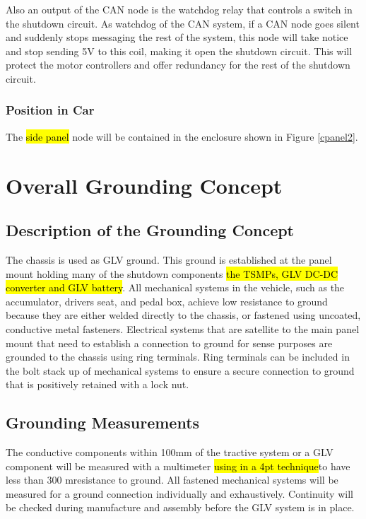\documentclass{article}
\DeclareRobustCommand{\hlr}[1]{{\sethlcolor{red}\hl{#1}}}
\begin{document}
            Also an output of the CAN node is the watchdog relay that controls a switch in the shutdown circuit. As watchdog of the CAN system, if a CAN node goes silent and suddenly stops messaging the rest of the system, this node will take notice and stop sending 5V to this coil, making it open the shutdown circuit. This will protect the motor controllers and offer redundancy for the rest of the shutdown circuit.

        \subsubsection{Position in Car}

            The \hlr{side panel} node will be contained in the enclosure shown in Figure \ref{cpanel2}.

\newpage

\section{Overall Grounding Concept}

    \subsection{Description of the Grounding Concept}


        The chassis is used as GLV ground. This ground is established at the panel mount holding many of the shutdown components \hlr{the TSMPs, GLV DC-DC converter and GLV battery}. All mechanical systems in the vehicle, such as the accumulator, drivers seat, and pedal box, achieve low resistance to ground because they are either welded directly to the chassis, or fastened using uncoated, conductive metal fasteners. Electrical systems that are satellite to the main panel mount that need to establish a connection to ground for sense purposes are grounded to the chassis using ring terminals. Ring terminals can be included in the bolt stack up of mechanical systems to ensure a secure connection to ground that is positively retained with a lock nut.


    \subsection{Grounding Measurements}

        The conductive components within 100mm of the tractive system or a GLV component will be measured with a multimeter \hlr{using in a 4pt technique}to have less than 300 m\ohm resistance to ground. All fastened mechanical systems will be measured for a ground connection individually and exhaustively. Continuity will be checked during manufacture and assembly before the GLV system is in place.\\
\end{document}

